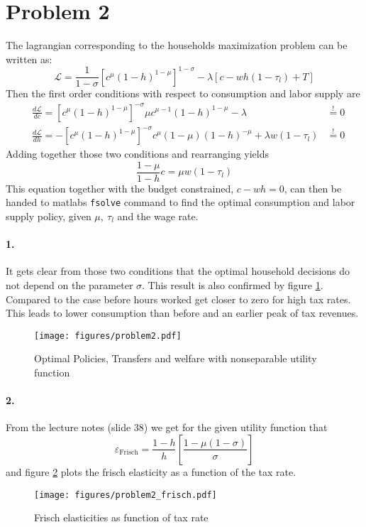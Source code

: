 \section*{Problem 2}

The lagrangian corresponding to the households maximization problem can be written as:
\begin{equation*}
\mathscr{L} = \frac{1}{1 - \sigma} \left[c^{\mu } \left(1 - h\right)^{1 - \mu}\right]^{1 - \sigma } - \lambda \left[c - w h \left(1 - \tau_l\right) + T\right]
\end{equation*}
Then the first order conditions with respect to consumption and labor supply are
\begin{align*}
&\frac{d \mathscr{L}}{d c} = \left[c^{\mu } \left(1 - h\right)^{1 - \mu}\right]^{-\sigma} \mu c^{\mu - 1} \left(1 - h\right)^{1 - \mu} - \lambda &\overset{!}{=} 0 \\
&\frac{d \mathscr{L}}{d h} = - \left[c^{\mu } \left(1 - h\right)^{1 - \mu}\right]^{-\sigma} c^\mu \left(1 - \mu\right) \left(1 - h\right)^{-\mu} + \lambda w \left(1 - \tau_l\right) &\overset{!}{=} 0
\end{align*}
Adding together those two conditions and rearranging yields
\begin{equation}
\frac{1 - \mu}{1 - h} c = \mu w \left(1 - \tau_l\right)
\end{equation}
This equation together with the budget constrained, $c - w h = 0$, can then be handed to matlabs \texttt{fsolve} command to find the optimal consumption and labor supply policy, given $\mu,~\tau_l$ and the wage rate. 

\paragraph{1.}
It gets clear from those two conditions that the optimal household decisions do not depend on the parameter $\sigma$. This result is also confirmed by figure \ref{fig:problem2}. Compared to the case before hours worked get closer to zero for high tax rates. This leads to lower consumption than before and an earlier peak of tax revenues.
\begin{figure}[h]
	\centering
			\texttt{[image: figures/problem2.pdf]}
	\caption{Optimal Policies, Transfers and welfare with nonseparable utility function}
	\label{fig:problem2}
\end{figure}

\paragraph{2.}
From the lecture notes (slide 38) we get for the given utility function that 
\begin{equation*}
\varepsilon_{\text{Frisch}} = \frac{1 - h}{h} \left[\frac{1 - \mu\left(1 - \sigma\right)}{\sigma}\right]
\end{equation*}
and figure \ref{fig:problem2_frisch} plots the frisch elasticity as a function of the tax rate.
\begin{figure}[h]
	\centering
			\texttt{[image: figures/problem2\_frisch.pdf]}
	\caption{Frisch elasticities as function of tax rate}
	\label{fig:problem2_frisch}
\end{figure}

